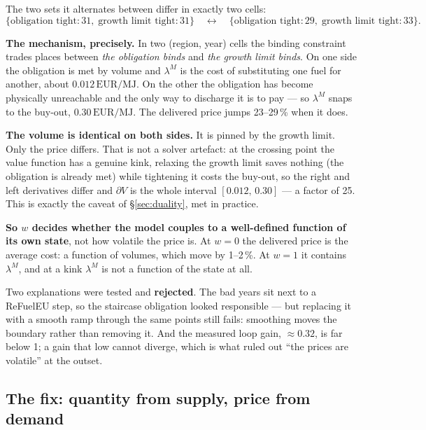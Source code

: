 \documentclass[11pt,a4paper]{article}
\newcommand{\EURMJ}{\ensuremath{\mathrm{EUR}/\mathrm{MJ}}}
\begin{document}
The two sets it alternates between differ in exactly two cells:
\[
\{\text{obligation tight}: 31,\; \text{growth limit tight}: 31\}
\quad\longleftrightarrow\quad
\{\text{obligation tight}: 29,\; \text{growth limit tight}: 33\}.
\]

\begin{keybox}
\textbf{The mechanism, precisely.} In two (region, year) cells the binding constraint
trades places between \emph{the obligation binds} and \emph{the growth limit binds}. On
one side the obligation is met by volume and $\lambda^{M}$ is the cost of substituting
one fuel for another, about $0.012$\,\EURMJ. On the other the obligation has become
physically unreachable and the only way to discharge it is to pay --- so $\lambda^{M}$
snaps to the buy-out, $0.30$\,\EURMJ. The delivered price jumps 23--29\,\% when it does.

\textbf{The volume is identical on both sides.} It is pinned by the growth limit. Only
the price differs. That is not a solver artefact: at the crossing point the value
function has a genuine kink, relaxing the growth limit saves nothing (the obligation is
already met) while tightening it costs the buy-out, so the right and left derivatives
differ and $\partial V$ is the whole interval $[0.012,\,0.30]$ --- a factor of 25. This
is exactly the caveat of \S\ref{sec:duality}, met in practice.

\textbf{So $w$ decides whether the model couples to a well-defined function of its own
state}, not how volatile the price is. At $w=0$ the delivered price is the average cost:
a function of volumes, which move by 1--2\,\%. At $w=1$ it contains $\lambda^{M}$, and
at a kink $\lambda^{M}$ is not a function of the state at all.
\end{keybox}

\noindent Two explanations were tested and \textbf{rejected}. The bad years sit next to a
ReFuelEU step, so the staircase obligation looked responsible --- but replacing it with a
smooth ramp through the same points still fails: smoothing moves the boundary rather than
removing it. And the measured loop gain, $\approx 0.32$, is far below 1; a gain that low
cannot diverge, which is what ruled out ``the prices are volatile'' at the outset.

\subsection{The fix: quantity from supply, price from demand}
\label{sec:fix}
\end{document}
